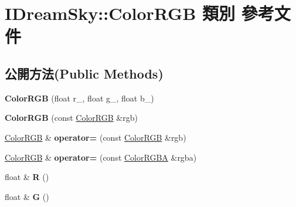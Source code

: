 \hypertarget{class_i_dream_sky_1_1_color_r_g_b}{}\section{I\+Dream\+Sky\+:\+:Color\+R\+GB 類別 參考文件}
\label{class_i_dream_sky_1_1_color_r_g_b}
\subsection*{公開方法(Public Methods)}
\begin{DoxyCompactItemize}
\item 
{\bfseries Color\+R\+GB} (float r\+\_, float g\+\_, float b\+\_)\hypertarget{class_i_dream_sky_1_1_color_r_g_b_adc98fa7020dc2d5b8e72c561a4b4c768}{}\label{class_i_dream_sky_1_1_color_r_g_b_adc98fa7020dc2d5b8e72c561a4b4c768}

\item 
{\bfseries Color\+R\+GB} (const \hyperlink{class_i_dream_sky_1_1_color_r_g_b}{Color\+R\+GB} \&rgb)\hypertarget{class_i_dream_sky_1_1_color_r_g_b_ac0a2c42c6785391956f818592deee4ed}{}\label{class_i_dream_sky_1_1_color_r_g_b_ac0a2c42c6785391956f818592deee4ed}

\item 
\hyperlink{class_i_dream_sky_1_1_color_r_g_b}{Color\+R\+GB} \& {\bfseries operator=} (const \hyperlink{class_i_dream_sky_1_1_color_r_g_b}{Color\+R\+GB} \&rgb)\hypertarget{class_i_dream_sky_1_1_color_r_g_b_a59639f5b1d1c2c6c505e4f6297b635a7}{}\label{class_i_dream_sky_1_1_color_r_g_b_a59639f5b1d1c2c6c505e4f6297b635a7}

\item 
\hyperlink{class_i_dream_sky_1_1_color_r_g_b}{Color\+R\+GB} \& {\bfseries operator=} (const \hyperlink{class_i_dream_sky_1_1_color_r_g_b_a}{Color\+R\+G\+BA} \&rgba)\hypertarget{class_i_dream_sky_1_1_color_r_g_b_aa3e346eba29d2a2ceee1626e8baffe81}{}\label{class_i_dream_sky_1_1_color_r_g_b_aa3e346eba29d2a2ceee1626e8baffe81}

\item 
float \& {\bfseries R} ()\hypertarget{class_i_dream_sky_1_1_color_r_g_b_a154237f7ac3795129882fc279d02b0f2}{}\label{class_i_dream_sky_1_1_color_r_g_b_a154237f7ac3795129882fc279d02b0f2}

\item 
float \& {\bfseries G} ()\hypertarget{class_i_dream_sky_1_1_color_r_g_b_a724218dbf99ede7cb76eaa84259d397f}{}\label{class_i_dream_sky_1_1_color_r_g_b_a724218dbf99ede7cb76eaa84259d397f}


\end{DoxyCompactItemize}
